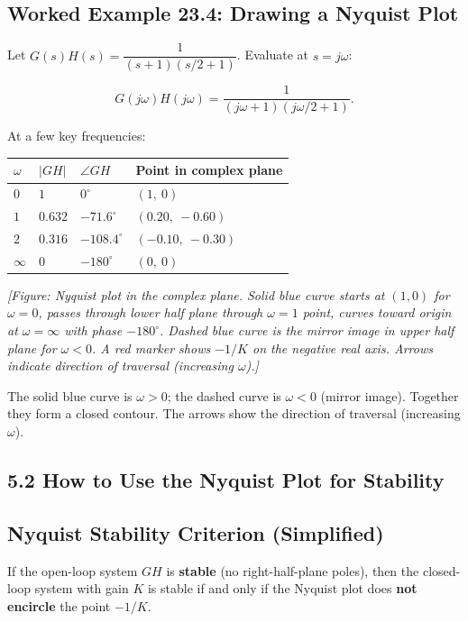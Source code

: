 \documentclass[11pt]{article}
\begin{document}
\subsection*{Worked Example 23.4: Drawing a Nyquist Plot}

Let $G(s)H(s) = \dfrac{1}{(s+1)(s/2+1)}$. Evaluate at $s = j\omega$:

\[G(j\omega)H(j\omega) = \frac{1}{(j\omega + 1)(j\omega/2 + 1)}.\]

At a few key frequencies:

\begin{center}
\begin{tabular}{|l|l|l|l|}
\hline
\textbf{$\omega$} & \textbf{$\lvert GH \rvert$} & \textbf{$\angle GH$} & \textbf{Point in complex plane} \\
\hline
$0$ & $1$ & $0^\circ$ & $(1,\ 0)$ \\
\hline
$1$ & $0.632$ & $-71.6^\circ$ & $(0.20,\ -0.60)$ \\
\hline
$2$ & $0.316$ & $-108.4^\circ$ & $(-0.10,\ -0.30)$ \\
\hline
$\infty$ & $0$ & $-180^\circ$ & $(0,\ 0)$ \\
\hline
\end{tabular}
\end{center}

\textit{[Figure: Nyquist plot in the complex plane. Solid blue curve starts at $(1,0)$ for $\omega = 0$, passes through lower half plane through $\omega = 1$ point, curves toward origin at $\omega = \infty$ with phase $-180^\circ$. Dashed blue curve is the mirror image in upper half plane for $\omega < 0$. A red marker shows $-1/K$ on the negative real axis. Arrows indicate direction of traversal (increasing $\omega$).]}

The solid blue curve is $\omega > 0$; the dashed curve is $\omega < 0$ (mirror image). Together they form a closed contour. The arrows show the direction of traversal (increasing $\omega$).

\subsection*{5.2 How to Use the Nyquist Plot for Stability}

\subsection*{Nyquist Stability Criterion (Simplified)}

If the open-loop system $GH$ is \textbf{stable} (no right-half-plane poles), then the closed-loop system with gain $K$ is stable if and only if the Nyquist plot does \textbf{not encircle} the point $-1/K$.
\end{document}
